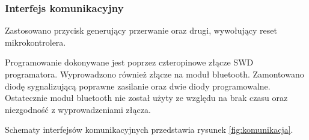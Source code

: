 \documentclass[12pt,a4paper]{article}
\begin{document}
\subsubsection{Interfejs komunikacyjny}
Zastosowano przycisk generujący przerwanie oraz drugi, wywołujący reset mikrokontrolera.

Programowanie dokonywane jest poprzez czteropinowe złącze SWD programatora. Wyprowadzono również złącze na moduł bluetooth. Zamontowano diodę sygnalizującą poprawne zasilanie oraz dwie diody programowalne.  
Ostatecznie moduł bluetooth nie został użyty ze względu na brak czasu oraz niezgodność z wyprowadzeniami złącza.

Schematy interfejsów komunikacyjnych przedstawia rysunek \ref{fig:komunikacja}.
%
\begin{figure}[tp]
\centering

    \hspace{0.4cm}



\end{figure}
\end{document}
